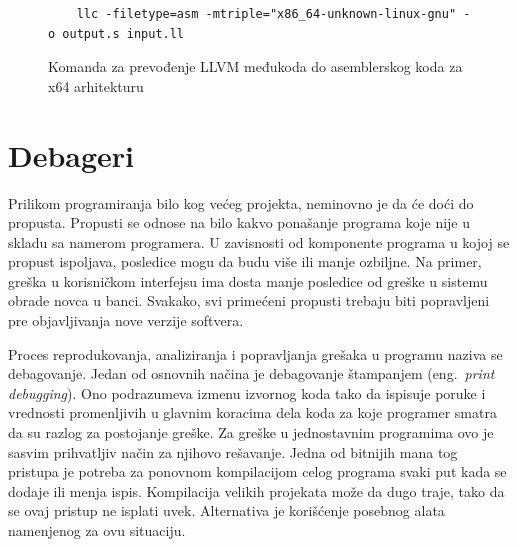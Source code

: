 \documentclass[12pt,oneside]{memoir}
\begin{document}
\begin{figure}[!ht]
  \begin{verbatim}
    llc -filetype=asm -mtriple="x86_64-unknown-linux-gnu" -o output.s input.ll
  \end{verbatim}
  \caption{Komanda za prevođenje LLVM međukoda do asemblerskog koda za x64 arhitekturu}
  \label{lst:llc_command}
\end{figure}


\chapter{Debageri}
\label{sec:debuggers}


Prilikom programiranja bilo kog većeg projekta, neminovno je da će doći do propusta.
Propusti se odnose na bilo kakvo ponašanje programa koje nije u skladu sa namerom programera.
U zavisnosti od komponente programa u kojoj se propust ispoljava, posledice mogu da budu više ili manje ozbiljne.
Na primer, greška u korisničkom interfejsu ima dosta manje posledice od greške u sistemu obrade novca u banci.
Svakako, svi primećeni propusti trebaju biti popravljeni pre objavljivanja nove verzije softvera.

Proces reprodukovanja, analiziranja i popravljanja grešaka u programu naziva se debagovanje.
Jedan od osnovnih načina je debagovanje štampanjem (eng.~{\em print debugging}).
Ono podrazumeva izmenu izvornog koda tako da ispisuje poruke i vrednosti promenljivih u glavnim koracima dela koda za koje programer smatra da su razlog za postojanje greške.
Za greške u jednostavnim programima ovo je sasvim prihvatljiv način za njihovo rešavanje.
Jedna od bitnijih mana tog pristupa je potreba za ponovnom kompilacijom celog programa svaki put kada se dodaje ili menja ispis.
Kompilacija velikih projekata može da dugo traje, tako da se ovaj pristup ne isplati uvek.
Alternativa je korišćenje posebnog alata namenjenog za ovu situaciju.
\end{document}

